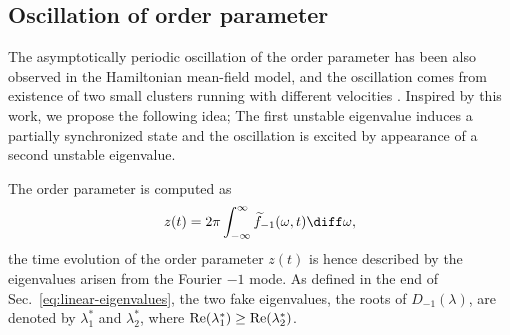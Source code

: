 
\subsection{Oscillation of order parameter}
\label{sec:oscillation}

The asymptotically periodic oscillation of the order parameter
has been also observed in the Hamiltonian mean-field model,
and the oscillation comes from existence of two small clusters
running with different velocities \cite{morita-kaneko-06}.
Inspired by this work, we propose the following idea;
The first unstable eigenvalue induces a partially synchronized state
and the oscillation is excited by appearance of a second unstable eigenvalue.

The order parameter is computed as
\begin{align}
  z(t)
  = 2\pi \int_{-\infty}^{\infty} \widetilde{f}_{-1}(\omega,t) \diff\omega,
\end{align}
the time evolution of the order parameter $z(t)$ is hence described
by the eigenvalues arisen from the Fourier $-1$ mode.
As defined in the end of Sec.~\ref{eq:linear-eigenvalues},
the two fake eigenvalues, the roots of $D_{-1}(\lambda)$,
are denoted by $\lambda_{1}^{\ast}$ and $\lambda_{2}^{\ast}$,
where ${\rm Re}(\lambda_{1}^{\ast})\geq{\rm Re}(\lambda_{2}^{\ast})$.


